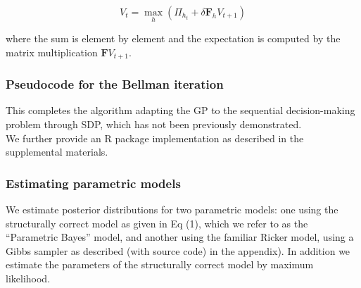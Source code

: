 \documentclass[author-year, review]{elsarticle} %
\newenvironment{Shaded}{}{}
\newcommand{\KeywordTok}[1]{\textcolor[rgb]{0.00,0.44,0.13}{\textbf{{#1}}}}
\newcommand{\DataTypeTok}[1]{\textcolor[rgb]{0.56,0.13,0.00}{{#1}}}
\newcommand{\DecValTok}[1]{\textcolor[rgb]{0.25,0.63,0.44}{{#1}}}
\newcommand{\CommentTok}[1]{\textcolor[rgb]{0.38,0.63,0.69}{\textit{{#1}}}}
\newcommand{\NormalTok}[1]{{#1}}
\begin{document}
\[V_{t} = \max_h \left( \Pi_{h_{t}} + \delta \mathbf{F}_h V_{t+1} \right)\]

where the sum is element by element and the expectation is computed by
the matrix multiplication $\mathbf{F} V_{t+1}$.

\subsubsection{Pseudocode for the Bellman iteration}

\begin{Shaded}
\end{Shaded}

This completes the algorithm adapting the GP to the sequential
decision-making problem through SDP, which has not been previously
demonstrated.\\We further provide an R package implementation as
described in the supplemental materials.

\subsubsection{Estimating parametric models}

We estimate posterior distributions for two parametric models: one using
the structurally correct model as given in Eq (1), which we refer to as
the ``Parametric Bayes'' model, and another using the familiar Ricker
model, using a Gibbs sampler as described (with source code) in the
appendix). In addition we estimate the parameters of the structurally
correct model by maximum likelihood.
\end{document}
